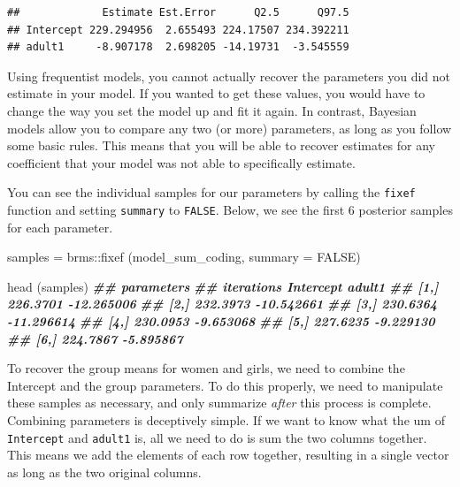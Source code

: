 \documentclass[
]{book}
\newenvironment{Shaded}{\begin{snugshade}}{\end{snugshade}}
\newcommand{\AttributeTok}[1]{\textcolor[rgb]{0.77,0.63,0.00}{#1}}
\newcommand{\ConstantTok}[1]{\textcolor[rgb]{0.00,0.00,0.00}{#1}}
\newcommand{\DocumentationTok}[1]{\textcolor[rgb]{0.56,0.35,0.01}{\textbf{\textit{#1}}}}
\newcommand{\FunctionTok}[1]{\textcolor[rgb]{0.00,0.00,0.00}{#1}}
\newcommand{\NormalTok}[1]{#1}
\newcommand{\OtherTok}[1]{\textcolor[rgb]{0.56,0.35,0.01}{#1}}
\newcommand{\SpecialCharTok}[1]{\textcolor[rgb]{0.00,0.00,0.00}{#1}}
\begin{document}
\begin{verbatim}
##             Estimate Est.Error      Q2.5      Q97.5
## Intercept 229.294956  2.655493 224.17507 234.392211
## adult1     -8.907178  2.698205 -14.19731  -3.545559
\end{verbatim}

Using frequentist models, you cannot actually recover the parameters you did not estimate in your model. If you wanted to get these values, you would have to change the way you set the model up and fit it again. In contrast, Bayesian models allow you to compare any two (or more) parameters, as long as you follow some basic rules. This means that you will be able to recover estimates for any coefficient that your model was not able to specifically estimate.

You can see the individual samples for our parameters by calling the \texttt{fixef} function and setting \texttt{summary} to \texttt{FALSE}. Below, we see the first 6 posterior samples for each parameter.

\begin{Shaded}
\begin{Highlighting}[]
\NormalTok{samples }\OtherTok{=}\NormalTok{ brms}\SpecialCharTok{::}\FunctionTok{fixef}\NormalTok{ (model\_sum\_coding, }\AttributeTok{summary =} \ConstantTok{FALSE}\NormalTok{)}

\FunctionTok{head}\NormalTok{ (samples)}
\DocumentationTok{\#\#           parameters}
\DocumentationTok{\#\# iterations Intercept     adult1}
\DocumentationTok{\#\#       [1,]  226.3701 {-}12.265006}
\DocumentationTok{\#\#       [2,]  232.3973 {-}10.542661}
\DocumentationTok{\#\#       [3,]  230.6364 {-}11.296614}
\DocumentationTok{\#\#       [4,]  230.0953  {-}9.653068}
\DocumentationTok{\#\#       [5,]  227.6235  {-}9.229130}
\DocumentationTok{\#\#       [6,]  224.7867  {-}5.895867}
\end{Highlighting}
\end{Shaded}

To recover the group means for women and girls, we need to combine the Intercept and the group parameters. To do this properly, we need to manipulate these samples as necessary, and only summarize \emph{after} this process is complete. Combining parameters is deceptively simple. If we want to know what the um of \texttt{Intercept} and \texttt{adult1} is, all we need to do is sum the two columns together. This means we add the elements of each row together, resulting in a single vector as long as the two original columns.
\end{document}
